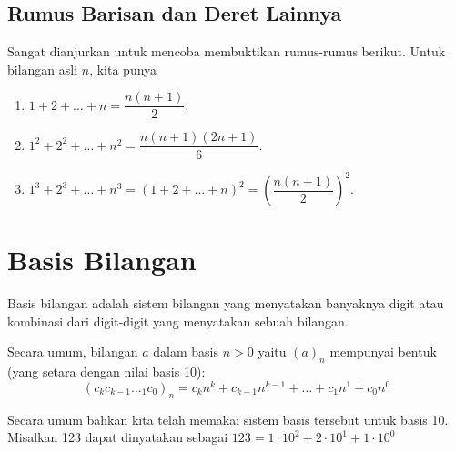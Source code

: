     \subsection{Rumus Barisan dan Deret Lainnya}
    Sangat dianjurkan untuk mencoba membuktikan rumus-rumus berikut. Untuk bilangan asli $n$, kita punya
    \begin{enumerate}
        \item $1+2+\dots+n = \dfrac{n(n+1)}{2}.$
        \item $1^2+2^2+\dots+n^2 = \dfrac{n(n+1)(2n+1)}{6}.$
        \item $1^3+2^3+\dots+n^3 = \left(1+2+\dots+n\right)^2= \left(\dfrac{n(n+1)}{2}\right)^2.$
    \end{enumerate}
    
    \section{Basis Bilangan}
        Basis bilangan adalah sistem bilangan yang menyatakan banyaknya digit atau kombinasi dari digit-digit yang menyatakan sebuah bilangan.
        
        Secara umum, bilangan $a$ dalam basis $n > 0$ yaitu $(a)_n$ mempunyai bentuk (yang setara dengan nilai basis 10):
        $$(c_kc_{k-1}\dotsc_1c_0)_n = c_{k}n^k + c_{k-1}n^{k-1}+\dots+c_1n^{1}+c_0n^{0}$$
        
        Secara umum bahkan kita telah memakai sistem basis tersebut untuk basis 10. Misalkan 123 dapat dinyatakan sebagai $123 = 1\cdot 10^2 + 2\cdot 10^1 + 1\cdot 10^0$
        
